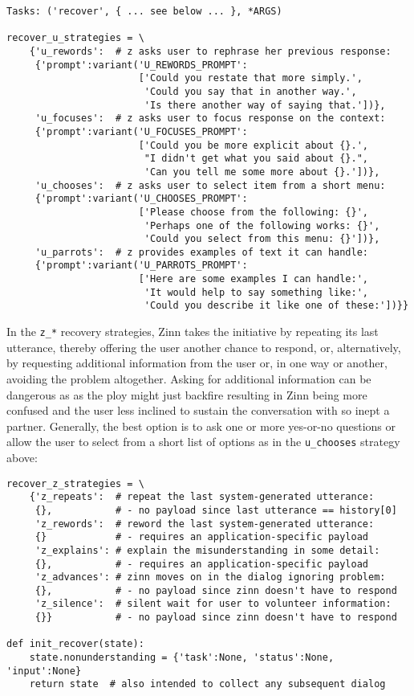 \documentclass[letterpaper,11pt]{article}
\begin{document}
\begin{verbatim}
Tasks: ('recover', { ... see below ... }, *ARGS)

recover_u_strategies = \
    {'u_rewords':  # z asks user to rephrase her previous response:
     {'prompt':variant('U_REWORDS_PROMPT':
                       ['Could you restate that more simply.',
                        'Could you say that in another way.',
                        'Is there another way of saying that.'])},
     'u_focuses':  # z asks user to focus response on the context:
     {'prompt':variant('U_FOCUSES_PROMPT':
                       ['Could you be more explicit about {}.',
                        "I didn't get what you said about {}.",
                        'Can you tell me some more about {}.'])},
     'u_chooses':  # z asks user to select item from a short menu:
     {'prompt':variant('U_CHOOSES_PROMPT':
                       ['Please choose from the following: {}',
                        'Perhaps one of the following works: {}',
                        'Could you select from this menu: {}'])},
     'u_parrots':  # z provides examples of text it can handle:
     {'prompt':variant('U_PARROTS_PROMPT':
                       ['Here are some examples I can handle:',
                        'It would help to say something like:',
                        'Could you describe it like one of these:'])}}
\end{verbatim}

In the {\tt{z\_*}} recovery strategies, Zinn takes the initiative by repeating its last utterance, thereby offering the user another chance to respond, or, alternatively, by requesting additional information from the user or, in one way or another, avoiding the problem altogether.  Asking for additional information can be dangerous as as the ploy might just backfire resulting in Zinn being more confused and the user less inclined to sustain the conversation with so inept a partner.  Generally, the best option is to ask one or more yes-or-no questions or allow the user to select from a short list of options as in the {\tt{u\_chooses}} strategy above:
%
\begin{verbatim}
recover_z_strategies = \
    {'z_repeats':  # repeat the last system-generated utterance:
     {},           # - no payload since last utterance == history[0]
     'z_rewords':  # reword the last system-generated utterance: 
     {}            # - requires an application-specific payload
     'z_explains': # explain the misunderstanding in some detail:
     {},           # - requires an application-specific payload
     'z_advances': # zinn moves on in the dialog ignoring problem:  
     {},           # - no payload since zinn doesn't have to respond 
     'z_silence':  # silent wait for user to volunteer information:
     {}}           # - no payload since zinn doesn't have to respond 

def init_recover(state):
    state.nonunderstanding = {'task':None, 'status':None, 'input':None}
    return state  # also intended to collect any subsequent dialog
\end{verbatim}
\end{document}
